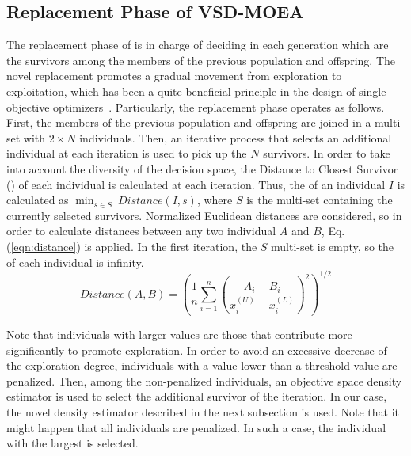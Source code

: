 \subsection{Replacement Phase of VSD-MOEA}

The replacement phase of \EAS{} is in charge of deciding in each generation which are the survivors 
among the members of the previous population and offspring.
%
The novel replacement promotes a gradual movement from exploration to exploitation, which has been a quite 
beneficial principle in the design of single-objective optimizers~\cite{Joel:MULTI_DYNAMIC}.
%
Particularly, the replacement phase operates as follows.
%
First, the members of the previous population and offspring are joined in a multi-set with $2 \times N$ individuals.
%
%
%
Then, an iterative process that selects an additional
individual at each iteration is used to pick up the $N$ survivors. 
%
In order to take into account the diversity of the decision space, the Distance to Closest Survivor (\DCS{}) of each
individual is calculated at each iteration.
%
Thus, the \DCS{} of an individual $I$ is calculated as $\displaystyle{\min_{s \in S}\ Distance(I, s)}$,
where $S$ is the multi-set containing the currently selected survivors. 
%
Normalized Euclidean distances are considered, so in order to calculate distances between any two individual $A$ and $B$, 
Eq. (\ref{eqn:distance}) is applied.
%
In the first iteration, the $S$ multi-set is empty, so the \DCS{} of each individual is infinity.
%
\begin{equation}\label{eqn:distance}
Distance(A, B) =   \left ( \frac{1}{n}  \sum_{i=1}^n \left ( \frac{A_i - B_i}{x_i^{(U)} - x_i^{(L)}} \right )^2  \right)^{1/2}
\end{equation}

Note that individuals with larger \DCS{} values are those that contribute more significantly to promote exploration.
%
In order to avoid an excessive decrease of the exploration degree, individuals with a \DCS{} value lower 
than a threshold value are penalized.
%
Then, among the non-penalized individuals, an objective space density estimator is used to select the additional
survivor of the iteration.
%
In our case, the novel density estimator described in the next subsection is used. 
%
Note that it might happen that all individuals are penalized.
%
In such a case, the individual with the largest \DCS{} is selected.

